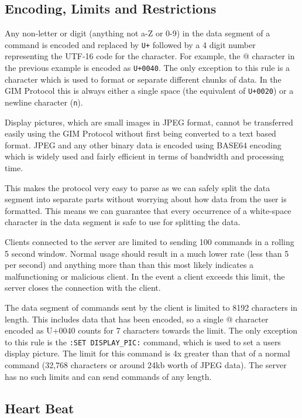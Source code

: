 \subsection{Encoding, Limits and Restrictions}

Any non-letter or digit (anything not a-Z or 0-9) in the data segment of a command is encoded and replaced by \texttt{\SLASH U+} followed by a 4 digit number representing the UTF-16 code for the character. For example, the @ character in the previous example is encoded as \texttt{\SLASH U+0040}. The only exception to this rule is a character which is used to format or separate different chunks of data. In the GIM Protocol this is always either a single space (the equivalent of \texttt{\SLASH U+0020}) or a newline character (\texttt{\SLASH n}).

Display pictures, which are small images in JPEG format, cannot be transferred easily using the GIM Protocol without first being converted to a text based format. JPEG and any other binary data is encoded using BASE64 encoding which is widely used and fairly efficient in terms of bandwidth and processing time.

This makes the protocol very easy to parse as we can safely split the data segment into separate parts without worrying about how data from the user is formatted. This means we can guarantee that every occurrence of a white-space character in the data segment is safe to use for splitting the data.

Clients connected to the server are limited to sending 100 commands in a rolling 5 second window. Normal usage should result in a much lower rate (less than 5 per second) and anything more than than this most likely indicates a malfunctioning or malicious client. In the event a client exceeds this limit, the server closes the connection with the client.

The data segment of commands sent by the client is limited to 8192 characters in length. This includes data that has been encoded, so a single @ character encoded as \SLASH U+0040 counts for 7 characters towards the limit. The only exception to this rule is the \texttt{:SET DISPLAY\_PIC:} command, which is used to set a users display picture. The limit for this command is 4x greater than that of a normal command (32,768 characters or around 24kb worth of JPEG data). The server has no such limits and can send commands of any length.

\subsection{Heart Beat}

